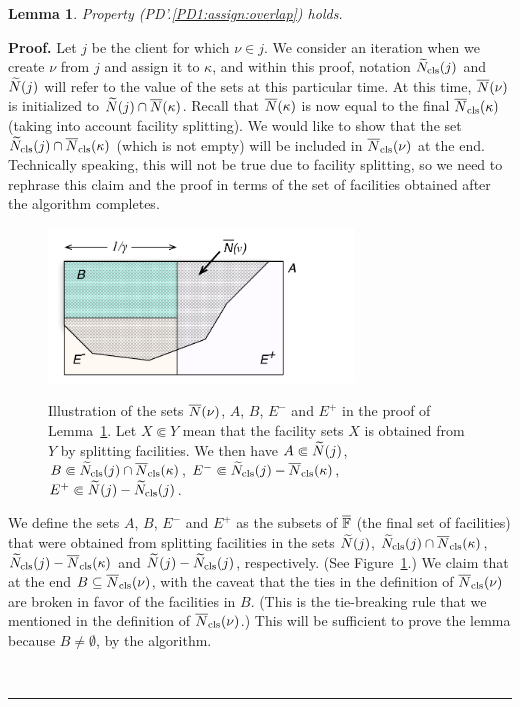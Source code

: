 \documentclass[oneside,final]{ucr}
\newtheorem{lemma}[theorem]{Lemma}
\newenvironment{proof}[1][Proof]{\textbf{#1.} }{\ \rule{0.5em}{0.5em}}
\def\dsp{\def\baselinestretch{2.0}\large\normalsize}
\def\ssp{\def\baselinestretch{1.0}\large\normalsize}
\begin{document}

\begin{lemma} \label{lem: PD1: primary overlap}
  Property (PD'.\ref{PD1:assign:overlap}) holds.
\end{lemma}
\begin{proof}
  Let $j$ be the client for which $\nu\in j$. We consider an iteration
  when we create $\nu$ from $j$ and assign it to $\kappa$, and
  within this proof, notation ${\widetilde N}_{{\mbox{\scriptsize\rm cls}}}(j)$ and ${\widetilde N}(j)$
  will refer to the value of the sets at this particular time.  
At this time, ${\overline{N}}(\nu)$ is initialized to ${\widetilde N}(j)\cap
  {\overline{N}}(\kappa)$.  Recall that ${\overline{N}}(\kappa)$ is now equal to the
  final ${\overline{N}}_{{\mbox{\scriptsize\rm cls}}}(\kappa)$ (taking into account facility splitting). We
  would like to show that the set ${\widetilde N}_{{\mbox{\scriptsize\rm cls}}}(j)\cap
  {\overline{N}}_{{\mbox{\scriptsize\rm cls}}}(\kappa)$ (which is not empty) will be included in
  ${\overline{N}}_{{\mbox{\scriptsize\rm cls}}}(\nu)$ at the end. Technically speaking, this will not be
  true due to facility splitting, so we need to rephrase this claim
  and the proof in terms of the set of facilities obtained after the
  algorithm completes.

\ssp
\begin{figure}[ht]
\begin{center}
\includegraphics[width=3.2in]{proof_of_lemma_PD'3a.pdf}
\ssp
\caption[Illustration of the sets in the proof of
Lemma~\ref{lem: PD1: primary overlap}]{Illustration of the
  sets ${\overline{N}}(\nu)$, $A$, $B$, $E^-$ and $E^+$ in the proof
  of Lemma~\ref{lem: PD1: primary overlap}. Let $X \Subset
  Y$ mean that the facility sets $X$ is obtained from $Y$ by
  splitting facilities.  We then have $A \Subset
  {\widetilde N}(j)$, $B \Subset {\widetilde N}_{{\mbox{\scriptsize\rm cls}}}(j) \cap
  {\overline{N}}_{{\mbox{\scriptsize\rm cls}}}(\kappa)$, $E^- \Subset {\widetilde N}_{{\mbox{\scriptsize\rm cls}}}(j) -
  {\overline{N}}_{{\mbox{\scriptsize\rm cls}}}(\kappa)$, $E^+ \Subset {\widetilde N}(j) -
  {\widetilde N}_{{\mbox{\scriptsize\rm cls}}}(j)$.}
\dsp
\label{fig: sets lemma PD'3a}
\end{center}
\end{figure}
\dsp
  We define the sets $A$, $B$, $E^-$ and $E^+$ as the subsets of
  $\overline{\mathbb{F}}$ (the final set of facilities) that were obtained from
  splitting facilities in the sets ${\widetilde N}(j)$, ${\widetilde N}_{{\mbox{\scriptsize\rm cls}}}(j)\cap
  {\overline{N}}_{{\mbox{\scriptsize\rm cls}}}(\kappa)$, ${\widetilde N}_{{\mbox{\scriptsize\rm cls}}}(j) - {\overline{N}}_{{\mbox{\scriptsize\rm cls}}}(\kappa)$ and
  ${\widetilde N}(j) - {\widetilde N}_{{\mbox{\scriptsize\rm cls}}}(j)$, respectively.  (See
  Figure~\ref{fig: sets lemma PD'3a}.)  We claim that at the end
  $B\subseteq {\overline{N}}_{{\mbox{\scriptsize\rm cls}}}(\nu)$, with the caveat that the ties in the
  definition of ${\overline{N}}_{{\mbox{\scriptsize\rm cls}}}(\nu)$ are broken in favor of the
  facilities in $B$.  (This is the tie-breaking rule that we mentioned
  in the definition of ${\overline{N}}_{{\mbox{\scriptsize\rm cls}}}(\nu)$.)  This will be sufficient to
  prove the lemma because $B\neq\emptyset$, by the algorithm.


\end{proof}
\end{document}
